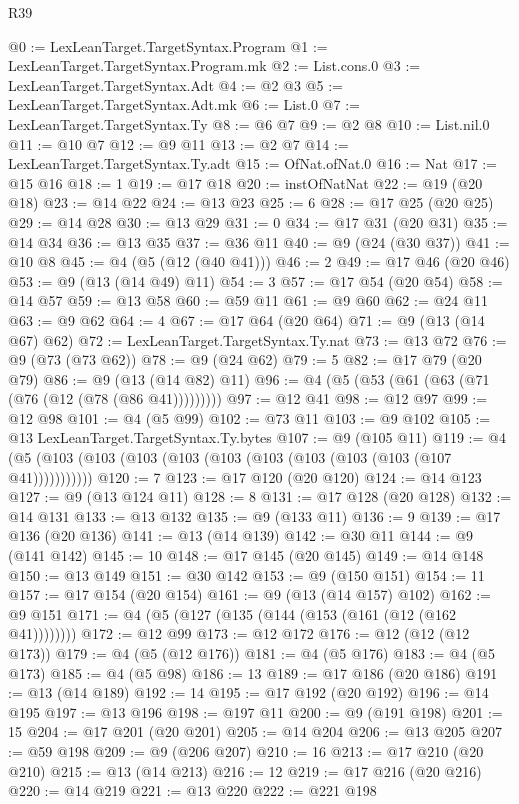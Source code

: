 \begin{lexlean}{R39}
\begin{coremodule}
@0 := LexLeanTarget.TargetSyntax.Program
@1 := LexLeanTarget.TargetSyntax.Program.mk
@2 := List.cons.{0}
@3 := LexLeanTarget.TargetSyntax.Adt
@4 := @2 @3
@5 := LexLeanTarget.TargetSyntax.Adt.mk
@6 := List.{0}
@7 := LexLeanTarget.TargetSyntax.Ty
@8 := @6 @7
@9 := @2 @8
@10 := List.nil.{0}
@11 := @10 @7
@12 := @9 @11
@13 := @2 @7
@14 := LexLeanTarget.TargetSyntax.Ty.adt
@15 := OfNat.ofNat.{0}
@16 := Nat
@17 := @15 @16
@18 := 1
@19 := @17 @18
@20 := instOfNatNat
@22 := @19 (@20 @18)
@23 := @14 @22
@24 := @13 @23
@25 := 6
@28 := @17 @25 (@20 @25)
@29 := @14 @28
@30 := @13 @29
@31 := 0
@34 := @17 @31 (@20 @31)
@35 := @14 @34
@36 := @13 @35
@37 := @36 @11
@40 := @9 (@24 (@30 @37))
@41 := @10 @8
@45 := @4 (@5 (@12 (@40 @41)))
@46 := 2
@49 := @17 @46 (@20 @46)
@53 := @9 (@13 (@14 @49) @11)
@54 := 3
@57 := @17 @54 (@20 @54)
@58 := @14 @57
@59 := @13 @58
@60 := @59 @11
@61 := @9 @60
@62 := @24 @11
@63 := @9 @62
@64 := 4
@67 := @17 @64 (@20 @64)
@71 := @9 (@13 (@14 @67) @62)
@72 := LexLeanTarget.TargetSyntax.Ty.nat
@73 := @13 @72
@76 := @9 (@73 (@73 @62))
@78 := @9 (@24 @62)
@79 := 5
@82 := @17 @79 (@20 @79)
@86 := @9 (@13 (@14 @82) @11)
@96 := @4 (@5 (@53 (@61 (@63 (@71 (@76 (@12 (@78 (@86 @41)))))))))
@97 := @12 @41
@98 := @12 @97
@99 := @12 @98
@101 := @4 (@5 @99)
@102 := @73 @11
@103 := @9 @102
@105 := @13 LexLeanTarget.TargetSyntax.Ty.bytes
@107 := @9 (@105 @11)
@119 := @4 (@5 (@103 (@103 (@103 (@103 (@103 (@103 (@103 (@103 (@103 (@107 @41)))))))))))
@120 := 7
@123 := @17 @120 (@20 @120)
@124 := @14 @123
@127 := @9 (@13 @124 @11)
@128 := 8
@131 := @17 @128 (@20 @128)
@132 := @14 @131
@133 := @13 @132
@135 := @9 (@133 @11)
@136 := 9
@139 := @17 @136 (@20 @136)
@141 := @13 (@14 @139)
@142 := @30 @11
@144 := @9 (@141 @142)
@145 := 10
@148 := @17 @145 (@20 @145)
@149 := @14 @148
@150 := @13 @149
@151 := @30 @142
@153 := @9 (@150 @151)
@154 := 11
@157 := @17 @154 (@20 @154)
@161 := @9 (@13 (@14 @157) @102)
@162 := @9 @151
@171 := @4 (@5 (@127 (@135 (@144 (@153 (@161 (@12 (@162 @41))))))))
@172 := @12 @99
@173 := @12 @172
@176 := @12 (@12 (@12 @173))
@179 := @4 (@5 (@12 @176))
@181 := @4 (@5 @176)
@183 := @4 (@5 @173)
@185 := @4 (@5 @98)
@186 := 13
@189 := @17 @186 (@20 @186)
@191 := @13 (@14 @189)
@192 := 14
@195 := @17 @192 (@20 @192)
@196 := @14 @195
@197 := @13 @196
@198 := @197 @11
@200 := @9 (@191 @198)
@201 := 15
@204 := @17 @201 (@20 @201)
@205 := @14 @204
@206 := @13 @205
@207 := @59 @198
@209 := @9 (@206 @207)
@210 := 16
@213 := @17 @210 (@20 @210)
@215 := @13 (@14 @213)
@216 := 12
@219 := @17 @216 (@20 @216)
@220 := @14 @219
@221 := @13 @220
@222 := @221 @198

\end{coremodule}
\end{lexlean}
